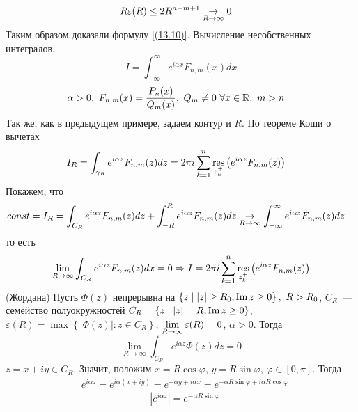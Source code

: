 \begin{align*}
  & R\varepsilon(R) \leq 2R^{n-m+1} \underset{R \to \infty}{\to} 0
\end{align*}
Таким образом доказали формулу \eqref{(13.10)}.
\Example
Вычисление несобственных интегралов.
\begin{equation}\label{(13.11)}
    I = \int_{-\infty}^{\infty}e^{i\alpha x}F_{n,m}(x)dx
\end{equation}
\begin{align*}
  & \alpha > 0, \ F_{n,m}(x) = \frac{P_n(x)}{Q_m(x)}, \ Q_m \neq 0 \ \forall x \in \mathbb{R}, \ m > n
\end{align*}
Так же, как в предыдущем примере, задаем контур и $R$. По теореме Коши о вычетах
\begin{align*}
  & I_R = \int_{\gamma_R}e^{i\alpha z}F_{n,m}(z) dz = 2 \pi i \sum_{k=1}^n\underset{z_k^+}{\mathrm{res}}\left( e^{i\alpha z} F_{n,m}(z)\right)
\end{align*}
Покажем, что
\begin{align*}
  & const = I_R = \int_{C_R}e^{i\alpha z}F_{n,m}(z) dz + \int_{-R}^Re^{i\alpha z}F_{n,m}(z) dz \underset{R \to \infty}{\to} \int_{-\infty}^\infty e^{i\alpha z}F_{n,m}(z) dz
\end{align*}
то есть
\begin{equation}\label{(13.12)}
    \lim_{R \to \infty} \int_{C_R}e^{i\alpha z}F_{n,m}(z)dx = 0 \Rightarrow I = 2 \pi i \sum_{k=1}^n \underset{z_k^+}{\mathrm{res}}\left( e^{i \alpha z}F_{n,m}(z) \right)
\end{equation}
\lemma (Жордана)
Пусть $\Phi(z)$ непрерывна на $\left\{ z \mid \left| z \right| \geq R_0, \mathrm{Im}\, z
    \geq 0 \right\}, \ R > R_0$, $C_R$~--- семейство полуокружностей $C_R = \{z
\mid \left| z \right| = R, \mathrm{Im}\, z \geq 0\}$, $ \varepsilon(R) = \max \left\{
    \left| \Phi(z) \right| : z \in C_R \right\}$, $ \displaystyle \lim_{R \to \infty}
\varepsilon(R) = 0$, $\alpha > 0$. Тогда
\begin{equation}\label{(13.13)}
    \lim_{R \to \infty}\int_{C_R}e^{i \alpha z}\Phi(z)dz = 0
\end{equation}
\pr
$z = x + iy \in C_R$. Значит, положим $x = R \cos \varphi$, $y = R \sin \varphi$,
$ \varphi \in [0,\pi]$. Тогда
\begin{align*}
  & e^{i \alpha z} = e^{i \alpha(x+iy)} = e^{-\alpha y + i \alpha x} = e^{-\alpha R \sin \varphi + i \alpha R \cos \varphi}
\end{align*}
\begin{align*}
  & \left| e^{i \alpha z} \right| = e^{-\alpha R \sin \varphi}
\end{align*}

